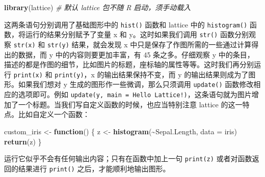 \documentclass[
  b5paper,
  UTF8,twoside]{book}
\newenvironment{Shaded}{\begin{snugshade}}{\end{snugshade}}
\newcommand{\AttributeTok}[1]{\textcolor[rgb]{0.13,0.29,0.53}{#1}}
\newcommand{\CommentTok}[1]{\textcolor[rgb]{0.56,0.35,0.01}{\textit{#1}}}
\newcommand{\ControlFlowTok}[1]{\textcolor[rgb]{0.13,0.29,0.53}{\textbf{#1}}}
\newcommand{\FunctionTok}[1]{\textcolor[rgb]{0.13,0.29,0.53}{\textbf{#1}}}
\newcommand{\NormalTok}[1]{#1}
\newcommand{\OtherTok}[1]{\textcolor[rgb]{0.56,0.35,0.01}{#1}}
\newcommand{\SpecialCharTok}[1]{\textcolor[rgb]{0.81,0.36,0.00}{\textbf{#1}}}
\begin{document}
\begin{Shaded}
\begin{Highlighting}[]
\FunctionTok{library}\NormalTok{(lattice) }\CommentTok{\# 默认 lattice 包不随 R 启动，须手动载入}
\end{Highlighting}
\end{Shaded}

\begin{Shaded}
\end{Shaded}

这两条语句分别调用了基础图形中的 \texttt{hist()} 函数和 lattice 中的 \texttt{histogram()} 函数，将运行的结果分别赋予了变量 x 和 y。这时如果我们调用 \texttt{str()} 函数分别观察 \texttt{str(x)} 和 \texttt{str(y)} 结果，就会发现 x 中只是保存了作图所需的一些通过计算得出的数据，而 y 中的内容则要更加丰富，有 45 条之多。仔细观察 y 中的条目，描述的都是作图的细节，比如图片的标题，座标轴的属性等等。这时我们再分别运行 \texttt{print(x)} 和 \texttt{print(y)}，x 的输出结果保持不变，而 y 的输出结果则成为了图形。如果我们想对 y 生成的图形作一些微调，那么只须调用 \texttt{update()} 函数修改相应的选项即可。例如 \texttt{update(y,\ main\ =\ \textquotesingle{}Hello\ Lattice!\textquotesingle{})}，这条语句就为图片增加了一个标题。当我们写自定义函数的时候，也应当特别注意 lattice 的这一特点。比如自定义一个函数：

\begin{Shaded}
\begin{Highlighting}[]
\NormalTok{custom\_iris }\OtherTok{\textless{}{-}} \ControlFlowTok{function}\NormalTok{() \{}
\NormalTok{  z }\OtherTok{\textless{}{-}} \FunctionTok{histogram}\NormalTok{(}\SpecialCharTok{\textasciitilde{}}\NormalTok{Sepal.Length, }\AttributeTok{data =}\NormalTok{ iris)}
  \FunctionTok{return}\NormalTok{(z)}
\NormalTok{\}}
\end{Highlighting}
\end{Shaded}

运行它似乎不会有任何输出内容；只有在函数中加上一句 \texttt{print(z)} 或者对函数返回的结果进行 \texttt{print()} 之后，才能顺利地输出图形。
\end{document}
